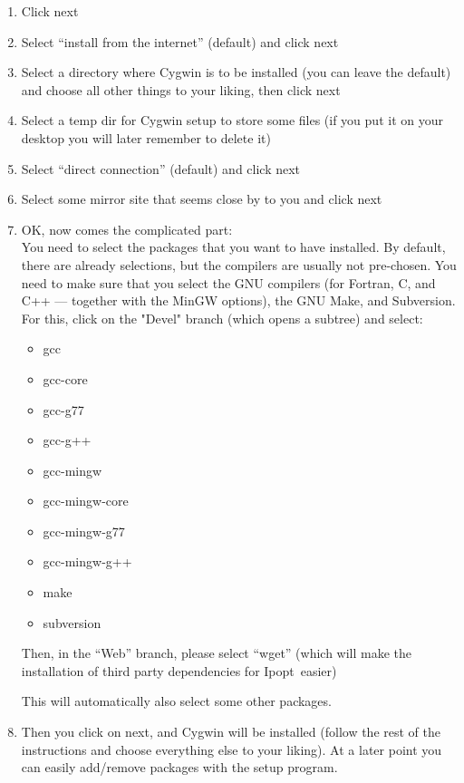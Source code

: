\documentclass[10pt]{article}
\newcommand{\Ipopt}{{\sc Ipopt}}
\begin{document}
\begin{enumerate}
\item Click next
\item Select ``install from the internet'' (default) and click next
\item Select a directory where Cygwin is to be installed (you can
  leave the default) and choose all other things to your liking, then
  click next
\item Select a temp dir for Cygwin setup to store some files (if you
  put it on your desktop you will later remember to delete it)
\item Select ``direct connection'' (default) and click next
\item Select some mirror site that seems close by to you and click next
\item OK, now comes the complicated part:\\
  You need to select the packages that you want to have installed.  By
  default, there are already selections, but the compilers are usually
  not pre-chosen.  You need to make sure that you select the GNU
  compilers (for Fortran, C, and C++ --- together with the MinGW
  options), the GNU Make, and Subversion.  For this, click on the "Devel"
  branch (which opens a subtree) and select:
  \begin{itemize}
  \item gcc
  \item gcc-core
  \item gcc-g77
  \item gcc-g++
  \item gcc-mingw
  \item gcc-mingw-core
  \item gcc-mingw-g77
  \item gcc-mingw-g++
  \item make
  \item subversion
  \end{itemize}

  Then, in the ``Web'' branch, please select ``wget'' (which will make
  the installation of third party dependencies for \Ipopt\ easier)

  This will automatically also select some other packages.
\item\label{it:cyg_done} Then you click on next, and Cygwin will be
  installed (follow the rest of the instructions and choose everything
  else to your liking).  At a later point you can easily add/remove
  packages with the setup program.


\end{enumerate}
\end{document}
